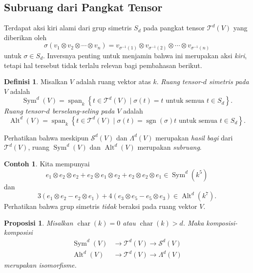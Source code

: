 \documentclass[12pt]{article}
\theoremstyle{plain}
\newtheorem{proposition}[theorem]{Proposisi}
\theoremstyle{definition}
\newtheorem{definition}[theorem]{Definisi}
\newtheorem{example}[theorem]{Contoh}
\theoremstyle{remark}
\numberwithin{equation}{section}
\begin{document}
\subsection{Subruang dari Pangkat Tensor}

Terdapat aksi kiri alami dari grup simetris $S_d$ pada
pangkat tensor $\mathcal{T}^d(V)$ yang diberikan oleh
\[
\sigma(v_1 \otimes v_2 \otimes \cdots \otimes v_n)
= v_{\sigma^{-1}(1)} \otimes v_{\sigma^{-1}(2)} \otimes \cdots
\otimes v_{\sigma^{-1}(n)}
\]
untuk $\sigma \in S_d$.
Inversnya penting untuk menjamin bahwa ini merupakan aksi \emph{kiri},
tetapi hal tersebut tidak terlalu relevan bagi pembahasan berikut.

\begin{definition}
Misalkan $V$ adalah ruang vektor atas $k$.
\emph{Ruang tensor-$d$ simetris pada $V$} adalah
\[
\operatorname{Sym}^d(V) = \operatorname{span}_k
\left\{ t \in \mathcal{T}^d(V) \mid \sigma(t)=t
\textrm{ untuk semua } t \in S_d  \right\} .
\]
\emph{Ruang tensor-$d$ berselang-seling pada $V$} adalah
\[
\operatorname{Alt}^d(V) = \operatorname{span}_k
\left\{ t \in \mathcal{T}^d(V) \mid
\sigma(t)=\operatorname{sgn}(\sigma)t
\textrm{ untuk semua } t \in S_d  \right\} .
\]
\end{definition}

Perhatikan bahwa meskipun $\mathcal{S}^d(V)$ dan $\Lambda^d(V)$ merupakan
\emph{hasil bagi} dari $\mathcal{T}^d(V)$,
ruang $\operatorname{Sym}^d(V)$
dan $\operatorname{Alt}^d(V)$
merupakan \emph{subruang}.

\begin{example}
Kita mempunyai
\[
e_1 \otimes e_2 \otimes e_2 + e_2 \otimes e_1 \otimes e_2
+ e_2 \otimes e_2 \otimes e_1 \in \operatorname{Sym}^d(k^5)
\]
dan
\[
3\left(e_1 \otimes e_2 - e_2 \otimes e_1\right)
+ 4\left( e_3 \otimes e_5 - e_5 \otimes e_3 \right) 
\in \operatorname{Alt}^d(k^7).
\]
Perhatikan bahwa grup simetris \emph{tidak} beraksi pada
ruang vektor $V$.
\end{example}

\begin{proposition} \label{prop:sym_alt_good_char}
Misalkan $\operatorname{char}(k) =0$ atau $\operatorname{char}(k) > d$.
Maka komposisi-komposisi
\begin{align*}
\operatorname{Sym}^d(V) &\to \mathcal{T}^d(V) \to \mathcal{S}^d(V)\\
\operatorname{Alt}^d(V) &\to \mathcal{T}^d(V) \to \Lambda^d(V)
\end{align*}
merupakan isomorfisme.
\end{proposition}
\end{document}
